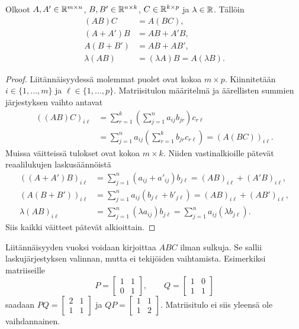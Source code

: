 \documentclass[11pt,a4paper]{amsart}
\begin{document}
  \begin{theorem}
    Olkoot $A,A'\in\mathbb{R}^{m\times n}$, $B,B'\in\mathbb{R}^{n\times k}$,
    $C\in\mathbb{R}^{k\times p}$ ja $\lambda\in\mathbb{R}$. Tällöin
    \begin{align*}
      (AB)C&=A(BC),\\
      (A+A')B&=AB+A'B,\\
      A(B+B')&=AB+AB',\\
      \lambda(AB)&=(\lambda A)B=A(\lambda B).
    \end{align*}
  \end{theorem}
  \begin{proof}
    Liitännäisyydessä molemmat puolet ovat kokoa $m\times p$.
    Kiinnitetään $i\in\{1,\ldots,m\}$ ja $\ell\in\{1,\ldots,p\}$.
    Matriisitulon määritelmä ja äärellisten summien järjestyksen vaihto
    antavat
    \begin{align*}
      ((AB)C)_{i\ell}
      &=\sum_{r=1}^k\left(\sum_{j=1}^n a_{ij}b_{jr}\right)c_{r\ell}\\
      &=\sum_{j=1}^n a_{ij}\left(\sum_{r=1}^k b_{jr}c_{r\ell}\right)
      =(A(BC))_{i\ell}.
    \end{align*}
    Muissa väitteissä tulokset ovat kokoa $m\times k$. Niiden
    vastinalkioille pätevät reaalilukujen laskusäännöistä
    \begin{align*}
      ((A+A')B)_{i\ell}
      &=\sum_{j=1}^n(a_{ij}+a'_{ij})b_{j\ell}
      =(AB)_{i\ell}+(A'B)_{i\ell},\\
      (A(B+B'))_{i\ell}
      &=\sum_{j=1}^n a_{ij}(b_{j\ell}+b'_{j\ell})
      =(AB)_{i\ell}+(AB')_{i\ell},\\
      \lambda(AB)_{i\ell}
      &=\sum_{j=1}^n(\lambda a_{ij})b_{j\ell}
      =\sum_{j=1}^n a_{ij}(\lambda b_{j\ell}).
    \end{align*}
    Siis kaikki väitteet pätevät alkioittain.
  \end{proof}

  Liitännäisyyden vuoksi voidaan kirjoittaa $ABC$ ilman sulkuja.
  Se sallii laskujärjestyksen valinnan, mutta ei tekijöiden vaihtamista.
  Esimerkiksi matriiseille
  \[
    P=
    \begin{bmatrix}1&1\\0&1
    \end{bmatrix},\qquad
    Q=
    \begin{bmatrix}1&0\\1&1
    \end{bmatrix}
  \]
  saadaan $PQ=\left[
    \begin{smallmatrix}2&1\\1&1
  \end{smallmatrix}\right]$
  ja $QP=\left[
    \begin{smallmatrix}1&1\\1&2
  \end{smallmatrix}\right]$.
  Matriisitulo ei siis yleensä ole vaihdannainen.
\end{document}
